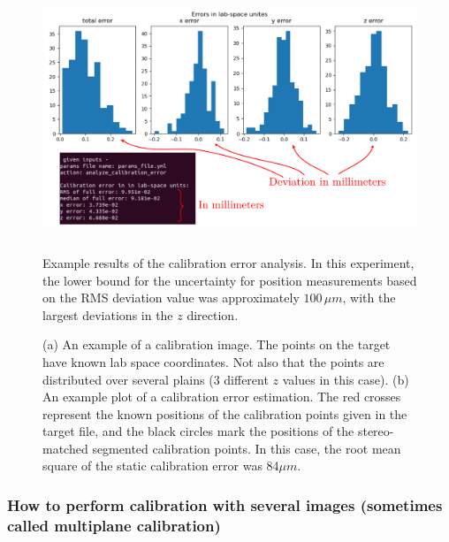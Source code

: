 \documentclass[10pt,a4paper]{article}
\begin{document}
\begin{figure}[h!]
	\centering
	\includegraphics[height=8cm]{Cal_error_analysis.pdf}
	\caption{Example results of the calibration error analysis. In this experiment, the lower bound for the uncertainty for position measurements based on the RMS deviation value was approximately $100 \, \mu m$, with the largest deviations in the $z$ direction.}
	\label{fig:cal_error}
\end{figure}







\begin{figure}[h!]
	\centering
	\hfill
	\caption{(a) An example of a calibration image. The points on the target have known lab space coordinates. Not also that the points are distributed over several plains (3 different $z$ values in this case). (b) An example plot of a calibration error estimation. The red crosses represent the known positions of the calibration points given in the target file, and the black circles mark the positions of the stereo-matched segmented calibration points. In this case, the root mean square of the static calibration error was 84$\mu m$.}
\end{figure}







\subsubsection{How to perform calibration with several images (sometimes called multiplane calibration)}\label{sec:multiplane_cal}
\end{document}
